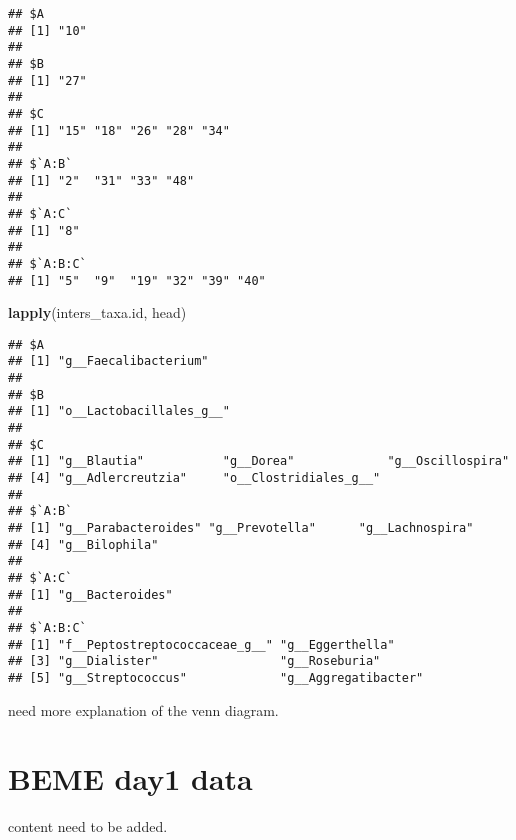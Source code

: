 \documentclass[]{book}
\newenvironment{Shaded}{\begin{snugshade}}{\end{snugshade}}
\newcommand{\KeywordTok}[1]{\textcolor[rgb]{0.13,0.29,0.53}{\textbf{#1}}}
\newcommand{\NormalTok}[1]{#1}
\begin{document}
\begin{verbatim}
## $A
## [1] "10"
## 
## $B
## [1] "27"
## 
## $C
## [1] "15" "18" "26" "28" "34"
## 
## $`A:B`
## [1] "2"  "31" "33" "48"
## 
## $`A:C`
## [1] "8"
## 
## $`A:B:C`
## [1] "5"  "9"  "19" "32" "39" "40"
\end{verbatim}

\begin{Shaded}
\begin{Highlighting}[]
\KeywordTok{lapply}\NormalTok{(inters_taxa.id, head) }
\end{Highlighting}
\end{Shaded}

\begin{verbatim}
## $A
## [1] "g__Faecalibacterium"
## 
## $B
## [1] "o__Lactobacillales_g__"
## 
## $C
## [1] "g__Blautia"           "g__Dorea"             "g__Oscillospira"     
## [4] "g__Adlercreutzia"     "o__Clostridiales_g__"
## 
## $`A:B`
## [1] "g__Parabacteroides" "g__Prevotella"      "g__Lachnospira"    
## [4] "g__Bilophila"      
## 
## $`A:C`
## [1] "g__Bacteroides"
## 
## $`A:B:C`
## [1] "f__Peptostreptococcaceae_g__" "g__Eggerthella"              
## [3] "g__Dialister"                 "g__Roseburia"                
## [5] "g__Streptococcus"             "g__Aggregatibacter"
\end{verbatim}

need more explanation of the venn diagram.

\section{BEME day1 data}\label{beme-day1-data-4}

content need to be added.


\end{document}
